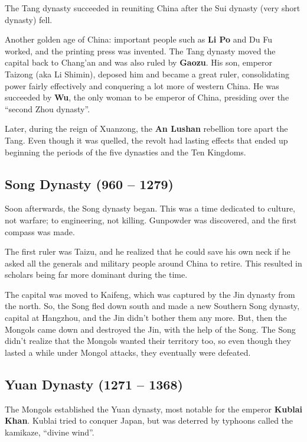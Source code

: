 The Tang dynasty succeeded in reuniting China after the Sui dynasty (very short dynasty) fell.

Another golden age of China: important people such as \textbf{Li Po} and Du Fu worked,
and the printing press was invented.
The Tang dynasty moved the capital back to Chang'an and was also ruled by \textbf{Gaozu}.
His son, emperor Taizong (aka Li Shimin), deposed him and became a great ruler,
consolidating power fairly effectively and conquering a lot more of western China.
He was succeeded by \textbf{Wu}, the only woman to be emperor of China,
presiding over the ``second Zhou dynasty''.

Later, during the reign of Xuanzong, the \textbf{An Lushan} rebellion tore apart the Tang.
Even though it was quelled, the revolt had lasting effects that ended up beginning the
periods of the five dynasties and the Ten Kingdoms.

\subsection*{Song Dynasty (960 -- 1279)}

Soon afterwards, the Song dynasty began.
This was a time dedicated to culture, not warfare;
to engineering, not killing.
Gunpowder was discovered, and the first compass was made.

The first ruler was Taizu, and he realized that he could save his own neck if he
asked all the generals and military people around China to retire.
This resulted in scholars being far more dominant during the time.

The capital was moved to Kaifeng, which was captured by the Jin dynasty from the north.
So, the Song fled down south and made a new Southern Song dynasty, capital at Hangzhou,
and the Jin didn't bother them any more.
But, then the Mongols came down and destroyed the Jin, with the help of the Song.
The Song didn't realize that the Mongols wanted their territory too,
so even though they lasted a while under Mongol attacks, they eventually were defeated.

\subsection*{Yuan Dynasty (1271 -- 1368)}

The Mongols established the Yuan dynasty, most notable for the emperor \textbf{Kublai Khan}.
Kublai tried to conquer Japan, but was deterred by typhoons called the kamikaze, ``divine wind''.

